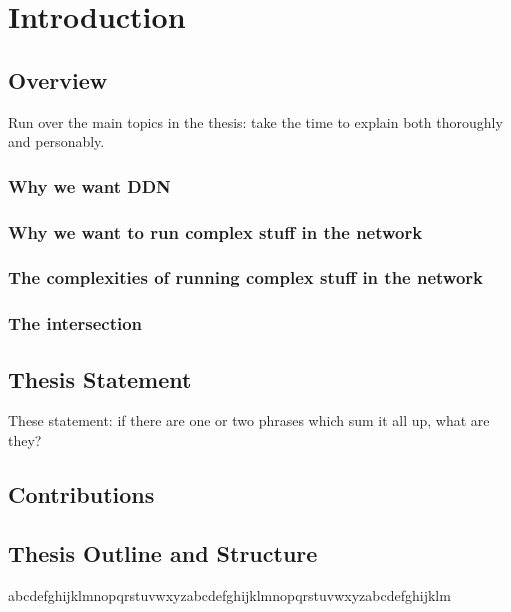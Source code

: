 \chapter{Introduction}

\section{Overview}

Run over the main topics in the thesis: take the time to explain both thoroughly and personably.

\subsection{Why we want DDN}

\subsection{Why we want to run complex stuff in the network}

\subsection{The complexities of running complex stuff in the network}

\subsection{The intersection}

\section{Thesis Statement}

These statement: if there are one or two phrases which sum it all up, what are they?

\section{Contributions}

\section{Thesis Outline and Structure}

abcdefghijklmnopqrstuvwxyzabcdefghijklmnopqrstuvwxyzabcdefghijklm